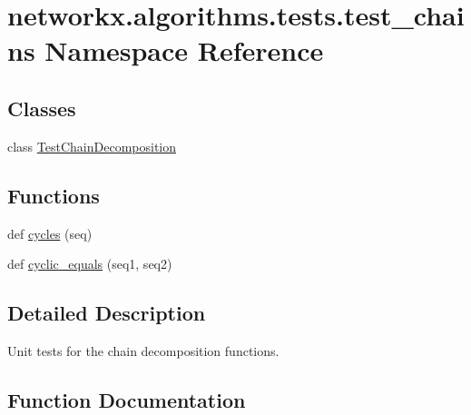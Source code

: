 \hypertarget{namespacenetworkx_1_1algorithms_1_1tests_1_1test__chains}{}\section{networkx.\+algorithms.\+tests.\+test\+\_\+chains Namespace Reference}
\label{namespacenetworkx_1_1algorithms_1_1tests_1_1test__chains}
\subsection*{Classes}
\begin{DoxyCompactItemize}
\item 
class \hyperlink{classnetworkx_1_1algorithms_1_1tests_1_1test__chains_1_1TestChainDecomposition}{Test\+Chain\+Decomposition}
\end{DoxyCompactItemize}
\subsection*{Functions}
\begin{DoxyCompactItemize}
\item 
def \hyperlink{namespacenetworkx_1_1algorithms_1_1tests_1_1test__chains_a409f71cb34e63dd9a43adcd3ea358d4f}{cycles} (seq)
\item 
def \hyperlink{namespacenetworkx_1_1algorithms_1_1tests_1_1test__chains_af14a5326f889f9a37ce0b1137415ce5e}{cyclic\+\_\+equals} (seq1, seq2)
\end{DoxyCompactItemize}


\subsection{Detailed Description}
\begin{DoxyVerb}Unit tests for the chain decomposition functions.\end{DoxyVerb}
 

\subsection{Function Documentation}
\mbox{\label{namespacenetworkx_1_1algorithms_1_1tests_1_1test__chains_a409f71cb34e63dd9a43adcd3ea358d4f}} 
